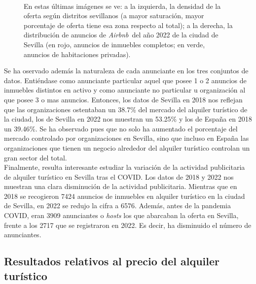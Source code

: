 \documentclass[a4paper,10pt]{article}
\newcommand*{\airbnb}{\textit{Airbnb}}
\begin{document}
\begin{figure}[ht]
                \hfill \\
                En estas últimas imágenes se ve: a la izquierda, la densidad de la oferta según distritos sevillanos (a mayor saturación, mayor
                porcentaje de oferta tiene esa zona respecto al total); a la derecha, la distribución de anuncios de \airbnb \ del año 2022
                de la ciudad de Sevilla (en rojo, anuncios de inmuebles completos; en verde, anuncios de habitaciones privadas).

            \end{figure}

            Se ha oservado además la naturaleza de cada anunciante en los tres conjuntos de datos. Entiéndase como anunciante particular 
            aquel que posee 1 o 2 anuncios de inmuebles distintos en activo y como anunciante no particular u organización al que posee 3 o mas 
            anuncios. Entonces, los datos de Sevilla en 2018 nos reflejan que las organizaciones ostentaban un 38.7\% del mercado del alquiler turístico de 
            la ciudad, los de Sevilla en 2022 nos muestran un 53.25\% y los de España en 2018 un 39.46\%. Se ha observado pues que no solo ha aumentado
            el porcentaje del mercado controlado por organizaciones en Sevilla, sino que incluso en España las organizaciones que tienen un negocio
            alrededor del alquiler turístico controlan un gran sector del total. \\ 

            Finalmente, resulta interesante estudiar la variación de la actividad publicitaria de alquiler turístico en Sevilla tras el COVID.
            Los datos de 2018 y 2022 nos muestran una clara disminución de la actividad publicitaria. Mientras que en 2018 se recogieron 
            7424 anuncios de inmuebles en alquiler turístico en la ciudad de Sevilla, en 2022 se redujo la cifra a 6576. Además, 
            antes de la pandemia COVID, eran 3909 anunciantes o \textit{hosts} los que abarcaban la oferta en Sevilla, frente a los 2717 que
            se registraron en 2022. Es decir, ha disminuido el número de anunciantes.

        \clearpage

        \subsection{Resultados relativos al precio del alquiler turístico}
            
\end{document}
